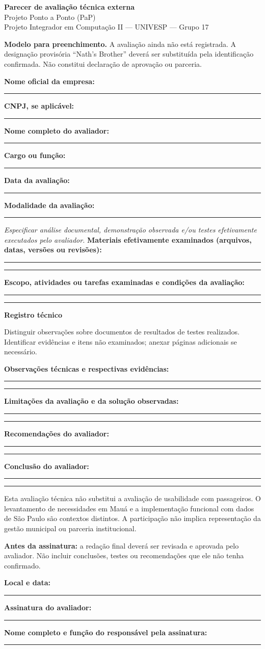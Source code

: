 \documentclass[12pt,a4paper]{article}
\newcommand{\campo}[1]{\textbf{#1}\par\rule{\linewidth}{0.4pt}\par}
\newcommand{\resposta}[1]{\textbf{#1}\par\vspace{6mm}\rule{\linewidth}{0.4pt}\par\vspace{6mm}\rule{\linewidth}{0.4pt}\par}
\begin{document}
\begin{center}
{\Large\bfseries Parecer de avaliação técnica externa}\\[4pt]
Projeto Ponto a Ponto (PaP)\\
Projeto Integrador em Computação II --- UNIVESP --- Grupo 17
\end{center}
\textbf{Modelo para preenchimento.} A avaliação ainda não está registrada. A designação provisória ``Nath's Brother'' deverá ser substituída pela identificação confirmada. Não constitui declaração de aprovação ou parceria.

\campo{Nome oficial da empresa:}
\campo{CNPJ, se aplicável:}
\campo{Nome completo do avaliador:}
\campo{Cargo ou função:}
\campo{Data da avaliação:}
\campo{Modalidade da avaliação:}
\textit{Especificar análise documental, demonstração observada e/ou testes efetivamente executados pelo avaliador.}
\resposta{Materiais efetivamente examinados (arquivos, datas, versões ou revisões):}
\resposta{Escopo, atividades ou tarefas examinadas e condições da avaliação:}

\newpage
\textbf{Registro técnico}

Distinguir observações sobre documentos de resultados de testes realizados. Identificar evidências e itens não examinados; anexar páginas adicionais se necessário.

\resposta{Observações técnicas e respectivas evidências:}
\resposta{Limitações da avaliação e da solução observadas:}
\resposta{Recomendações do avaliador:}
\resposta{Conclusão do avaliador:}

Esta avaliação técnica não substitui a avaliação de usabilidade com passageiros. O levantamento de necessidades em Mauá e a implementação funcional com dados de São Paulo são contextos distintos. A participação não implica representação da gestão municipal ou parceria institucional.

\textbf{Antes da assinatura:} a redação final deverá ser revisada e aprovada pelo avaliador. Não incluir conclusões, testes ou recomendações que ele não tenha confirmado.

\campo{Local e data:}
\vspace{6mm}
\campo{Assinatura do avaliador:}
\campo{Nome completo e função do responsável pela assinatura:}
\end{document}
